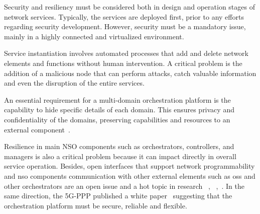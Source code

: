 Security and resiliency must be considered both in design and operation stages of network services. Typically, the services are deployed first, prior to any efforts regarding security development. However, security must be a mandatory issue, mainly in a highly connected and virtualized environment. 

Service instantiation involves automated processes that add and delete network elements and functions without human intervention. A critical problem is the addition of a malicious node that can perform attacks, catch valuable information and even the disruption of the entire services.      

An essential requirement for a multi-domain orchestration platform is the capability to hide specific details of each domain. This ensures privacy and confidentiality of the domains, preserving capabilities and resources to an external component~\cite{francescon2017x}.

Resilience in main NSO components such as orchestrators, controllers, and managers is also a critical problem because it can impact directly in overall service operation. Besides, open interfaces that support network programmability and \gls{nso} components communication with other external elements such as \gls{oss} and other orchestrators are an open issue and a hot topic in research ~\cite{Ordonez-Lucena2017NetworkChallenges}, ~\cite{Arfaoui2017SecurityDirections},~\cite{7345422}. In the same direction, the 5G-PPP published a white paper~\cite{elayoubi:hal-01488208} suggesting that the orchestration platform must be secure, reliable and flexible.






